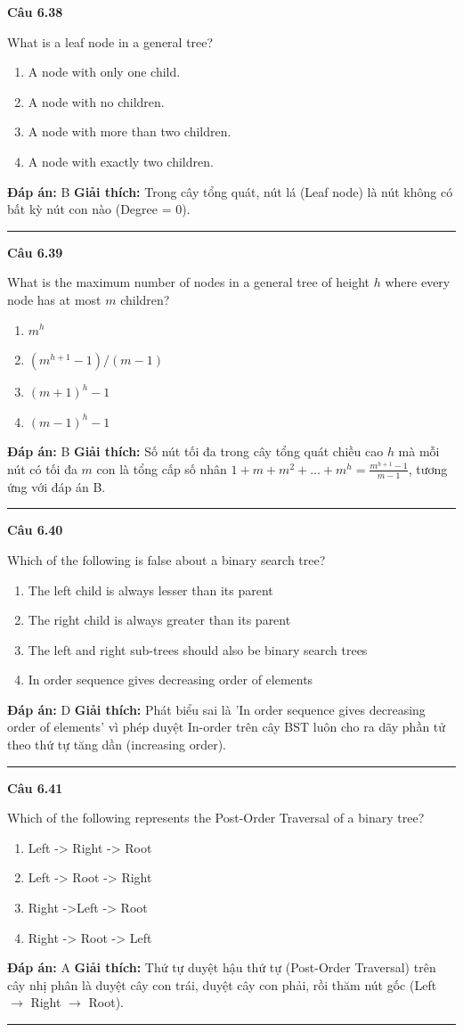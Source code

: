 \documentclass[11pt,a4paper]{article}
\newenvironment{question}[1]{%
  \par\vspace{1em}\noindent\textbf{\large Câu #1}\par\vspace{0.4em}
}{%
  \par\vspace{1em}\hrule\vspace{0.6em}
}
\newenvironment{choices}{%
  \begin{enumerate}[label=\textbf{\Alph*.},leftmargin=2.2em,itemsep=2pt,topsep=3pt]
}{%
  \end{enumerate}
}
\newcommand{\choice}{\item}
\begin{document}
\begin{question}{6.38}
What is a leaf node in a general tree?
\begin{choices}
\choice A node with only one child.
\choice A node with no children.
\choice A node with more than two children.
\choice A node with exactly two children.
\end{choices}
\textbf{Đáp án:} B
\textbf{Giải thích:} Trong cây tổng quát, nút lá (Leaf node) là nút không có bất kỳ nút con nào (Degree = 0).
\end{question}

\begin{question}{6.39}
What is the maximum number of nodes in a general tree of height \(h\) where every node has at most \(m\) children?
\begin{choices}
\choice \(m^h\)
\choice \((m^{h+1} - 1)/(m - 1)\)
\choice \((m + 1)^h - 1\)
\choice \((m - 1)^h - 1\)
\end{choices}
\textbf{Đáp án:} B
\textbf{Giải thích:} Số nút tối đa trong cây tổng quát chiều cao \(h\) mà mỗi nút có tối đa \(m\) con là tổng cấp số nhân \(1 + m + m^2 + \dots + m^h = \frac{m^{h+1} - 1}{m - 1}\), tương ứng với đáp án B.
\end{question}

\begin{question}{6.40}
Which of the following is false about a binary search tree?
\begin{choices}
\choice The left child is always lesser than its parent
\choice The right child is always greater than its parent
\choice The left and right sub-trees should also be binary search trees
\choice In order sequence gives decreasing order of elements
\end{choices}
\textbf{Đáp án:} D
\textbf{Giải thích:} Phát biểu sai là 'In order sequence gives decreasing order of elements' vì phép duyệt In-order trên cây BST luôn cho ra dãy phần tử theo thứ tự tăng dần (increasing order).
\end{question}

\begin{question}{6.41}
Which of the following represents the Post-Order Traversal of a binary tree?
\begin{choices}
\choice Left -> Right -> Root
\choice Left -> Root -> Right
\choice Right ->Left -> Root
\choice Right -> Root -> Left
\end{choices}
\textbf{Đáp án:} A
\textbf{Giải thích:} Thứ tự duyệt hậu thứ tự (Post-Order Traversal) trên cây nhị phân là duyệt cây con trái, duyệt cây con phải, rồi thăm nút gốc (Left \(\to\) Right \(\to\) Root).
\end{question}
\end{document}
